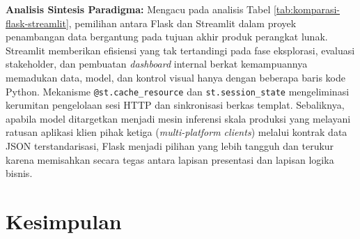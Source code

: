 \documentclass[a4paper,oneside,11pt]{book}
\begin{document}
\par \textbf{Analisis Sintesis Paradigma:} Mengacu pada analisis Tabel \ref{tab:komparasi-flask-streamlit}, pemilihan antara Flask dan Streamlit dalam proyek penambangan data bergantung pada tujuan akhir produk perangkat lunak. Streamlit memberikan efisiensi yang tak tertandingi pada fase eksplorasi, evaluasi stakeholder, dan pembuatan \textit{dashboard} internal berkat kemampuannya memadukan data, model, dan kontrol visual hanya dengan beberapa baris kode Python. Mekanisme \texttt{@st.cache\_resource} dan \texttt{st.session\_state} mengeliminasi kerumitan pengelolaan sesi HTTP dan sinkronisasi berkas templat. Sebaliknya, apabila model ditargetkan menjadi mesin inferensi skala produksi yang melayani ratusan aplikasi klien pihak ketiga (\textit{multi-platform clients}) melalui kontrak data JSON terstandarisasi, Flask menjadi pilihan yang lebih tangguh dan terukur karena memisahkan secara tegas antara lapisan presentasi dan lapisan logika bisnis.

\section{Kesimpulan}
\end{document}
